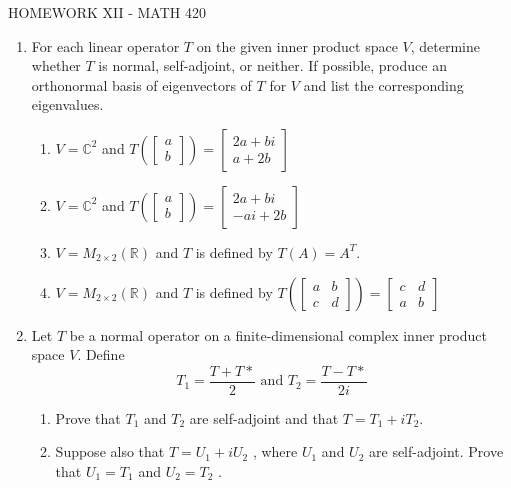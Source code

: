 \documentclass{article}
\begin{document}
\centerline{HOMEWORK XII - MATH 420}

\begin{enumerate}

\item For each linear operator $T$ on the given inner product space $V$, determine whether $T$ is normal, self-adjoint, or neither. If possible, produce an orthonormal basis of eigenvectors of $T$ for $V$ and list the corresponding eigenvalues.
    \begin{enumerate}
    
    \item $V=\mathbb{C}^2$ and $T\left(\left[\begin{array}{c}
    a\\b\end{array}\right]\right)=\left[\begin{array}{c}
    2a+bi\\a+2b\end{array}\right]$
    \item $V=\mathbb{C}^2$ and $T\left(\left[\begin{array}{c}
    a\\b\end{array}\right]\right)=\left[\begin{array}{c}
    2a+bi\\-ai+2b\end{array}\right]$
    
    
    
    \item $V=M_{2\times 2}(\mathbb{R})$ and $T$ is defined by $T(A)=A^T$.

    \item $V=M_{2\times 2}(\mathbb{R})$ and $T$ is defined by $T\left(\left[\begin{array}{cc}
    a&b\\c&d\end{array}\right]\right)=\left[\begin{array}{cc}
    c&d\\a&b\end{array}\right]$
  
    \end{enumerate}

\item 
Let $T$ be a normal operator on a finite-dimensional complex inner product space $V$. Define
$$T_1=\frac{T+T*}{2}\mbox{ and } T_2=\frac{T-T*}{2i} $$
\begin{enumerate}
\item
Prove that $T_1$ and $T_2$ are self-adjoint and that $T=T_1+iT_2$.
\item Suppose also that $T=U_1+iU_2$
, where $U_1$
 and $U_2$
 are self-adjoint. Prove that $U_1=T_1$
 and $U_2=T_2$
.


\end{enumerate}
\end{enumerate}
\end{document}
